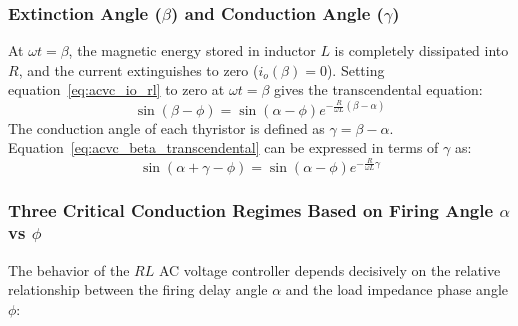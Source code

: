 \documentclass[11pt,a4paper]{article}
\begin{document}
\subsubsection{Extinction Angle ($\beta$) and Conduction Angle ($\gamma$)}
At $\omega t = \beta$, the magnetic energy stored in inductor $L$ is completely dissipated into $R$, and the current extinguishes to zero ($i_o(\beta) = 0$). Setting equation~\eqref{eq:acvc_io_rl} to zero at $\omega t = \beta$ gives the transcendental equation:
\begin{equation}
\sin(\beta - \phi) = \sin(\alpha - \phi) e^{-\frac{R}{\omega L}(\beta - \alpha)}
\label{eq:acvc_beta_transcendental}
\end{equation}
The conduction angle of each thyristor is defined as $\gamma = \beta - \alpha$. Equation~\eqref{eq:acvc_beta_transcendental} can be expressed in terms of $\gamma$ as:
\begin{equation}
\sin(\alpha + \gamma - \phi) = \sin(\alpha - \phi) e^{-\frac{R}{\omega L}\gamma}
\end{equation}

\subsubsection{Three Critical Conduction Regimes Based on Firing Angle $\alpha$ vs $\phi$}
The behavior of the $RL$ AC voltage controller depends decisively on the relative relationship between the firing delay angle $\alpha$ and the load impedance phase angle $\phi$:
\end{document}
